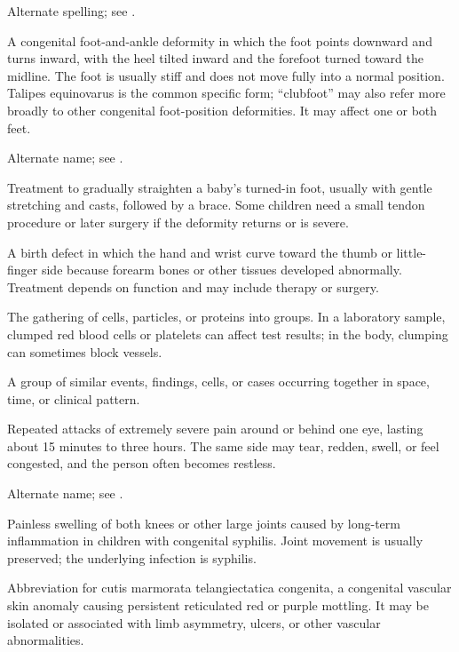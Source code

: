  Alternate spelling; see .

 A congenital foot-and-ankle deformity in which the foot points
downward and turns inward, with the heel tilted inward and the forefoot turned toward
the midline. The foot is usually stiff and does not move fully into a normal position.
Talipes equinovarus is the common specific form; “clubfoot” may also refer more broadly
to other congenital foot-position deformities. It may affect one or both feet.

 Alternate name; see
  .

 Treatment to gradually straighten a baby's turned-in foot, usually with gentle stretching and casts, followed by a brace. Some children need a small tendon procedure or later surgery if the deformity returns or is severe.

 A birth defect in which the hand and wrist curve toward the thumb or little-finger side because forearm bones or other tissues developed abnormally. Treatment depends on function and may include therapy or surgery.

 The gathering of cells, particles, or proteins into groups. In a laboratory sample, clumped red blood cells or platelets can affect test results; in the body, clumping can sometimes block vessels.

 A group of similar events, findings, cells, or cases occurring together in space, time, or clinical pattern.

 Repeated attacks of extremely severe pain around or behind one eye, lasting about 15 minutes to three hours. The same side may tear, redden, swell, or feel congested, and the person often becomes restless.

 Alternate name; see .

 Painless swelling of both knees or other large joints caused by long-term inflammation in children with congenital syphilis. Joint movement is usually preserved; the underlying infection is syphilis.

 Abbreviation for cutis marmorata telangiectatica congenita, a congenital vascular skin anomaly causing persistent reticulated red or purple mottling. It may be isolated or associated with limb asymmetry, ulcers, or other vascular abnormalities.

